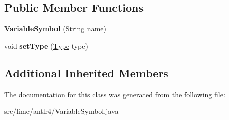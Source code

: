 \subsection*{Public Member Functions}
\begin{DoxyCompactItemize}
\item 
\mbox{\label{classlime_1_1antlr4_1_1VariableSymbol_a36811ec621a4203b950a5c52ef384936}} 
{\bfseries Variable\+Symbol} (String name)
\item 
\mbox{\label{classlime_1_1antlr4_1_1VariableSymbol_a3242e5eb207572718a7d2e7c00d09621}} 
void {\bfseries set\+Type} (\hyperlink{interfacelime_1_1antlr4_1_1Type}{Type} type)
\end{DoxyCompactItemize}
\subsection*{Additional Inherited Members}


The documentation for this class was generated from the following file\+:\begin{DoxyCompactItemize}
\item 
src/lime/antlr4/Variable\+Symbol.\+java\end{DoxyCompactItemize}
